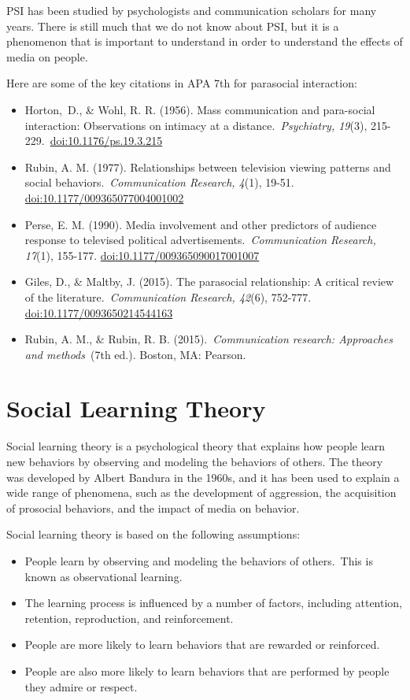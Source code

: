 \documentclass[
]{book}
\begin{document}
PSI has been studied by psychologists and communication scholars for many years. There is still much that we do not know about PSI, but it is a phenomenon that is important to understand in order to understand the effects of media on people.

Here are some of the key citations in APA 7th for parasocial interaction:

\begin{itemize}
\item
  Horton,~D., \& Wohl, R. R. (1956). Mass communication and para-social interaction: Observations on intimacy at a distance.~\emph{Psychiatry, 19}(3), 215-229.~\url{doi:10.1176/ps.19.3.215}
\item
  Rubin, A. M. (1977). Relationships between television viewing patterns and social behaviors.~\emph{Communication Research, 4}(1), 19-51. \url{doi:10.1177/009365077004001002}
\item
  Perse, E. M. (1990). Media involvement and other predictors of audience response to televised political advertisements.~\emph{Communication Research, 17}(1), 155-177. \url{doi:10.1177/009365090017001007}
\item
  Giles, D., \& Maltby, J. (2015). The parasocial relationship: A critical review of the literature.~\emph{Communication Research, 42}(6), 752-777. \url{doi:10.1177/0093650214544163}
\item
  Rubin, A. M., \& Rubin, R. B. (2015).~\emph{Communication research: Approaches and methods}~(7th ed.). Boston, MA: Pearson.
\end{itemize}

\section{Social Learning Theory}\label{social-learning-theory}

Social learning theory is a psychological theory that explains how people learn new behaviors by observing and modeling the behaviors of others. The theory was developed by Albert Bandura in the 1960s, and it has been used to explain a wide range of phenomena, such as the development of aggression, the acquisition of prosocial behaviors, and the impact of media on behavior.

Social learning theory is based on the following assumptions:

\begin{itemize}
\item
  People learn by observing and modeling the behaviors of others.~This is known as observational learning.
\item
  The learning process is influenced by a number of factors, including attention, retention, reproduction, and reinforcement.
\item
  People are more likely to learn behaviors that are rewarded or reinforced.
\item
  People are also more likely to learn behaviors that are performed by people they admire or respect.
\end{itemize}
\end{document}
